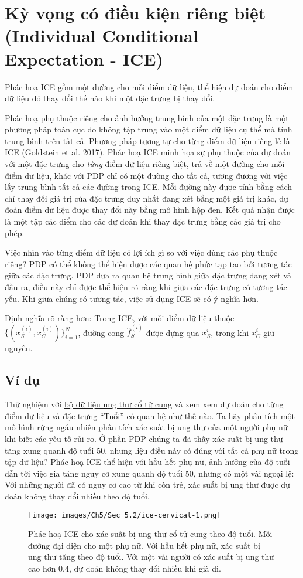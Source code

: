 \clearpage


\section{Kỳ vọng có điều kiện riêng biệt (Individual Conditional Expectation - ICE)}\label{Chap_5.2}
Phác hoạ ICE gồm một đường cho mỗi điểm dữ liệu, thể hiện dự đoán cho điểm dữ liệu đó thay đổi thế nào khi một đặc trưng bị thay đổi.

Phác hoạ phụ thuộc riêng cho ảnh hưởng trung bình của một đặc trưng là một phương pháp toàn cục do không tập trung vào một điểm dữ liệu cụ thể mà tính trung bình trên tất cả. Phương pháp tương tự cho từng điểm dữ liệu riêng lẻ là ICE (Goldstein et al. 2017). Phác hoạ ICE minh họa sự phụ thuộc của dự đoán với một đặc trưng cho \textit{từng} điểm dữ liệu riêng biệt, trả về một đường cho mỗi điểm dữ liệu, khác với PDP chỉ có một đường cho tất cả, tương đương với việc lấy trung bình tất cả các đường trong ICE. Mỗi đường này được tính bằng cách chỉ thay đổi giá trị của đặc trưng duy nhất đang xét bằng một giá trị khác, dự đoán điểm dữ liệu được thay đổi này bằng mô hình hộp đen. Kết quả nhận được là một tập các điểm cho các dự đoán khi thay đặc trưng bằng các giá trị cho phép.

Việc nhìn vào từng điểm dữ liệu có lợi ích gì so với việc dùng các phụ thuộc riêng? PDP có thể không thể hiện được các quan hệ phức tạp tạo bởi tương tác giữa các đặc trưng. PDP đưa ra quan hệ trung bình giữa đặc trưng đang xét và đầu ra, điều này chỉ được thể hiện rõ ràng khi giữa các đặc trưng có tương tác yếu. Khi giữa chúng có tương tác, việc sử dụng ICE sẽ có ý nghĩa hơn.

Định nghĩa rõ ràng hơn: Trong ICE, với mỗi điểm dữ liệu thuộc $\{(x_{S}^{(i)},x_{C}^{(i)})\}_{i=1}^N$, đường cong $\hat{f}_S^{(i)}$ được dựng qua $x_{S}^{i}$, trong khi $x_{C}^{i}$ giữ nguyên.
\subsection{Ví dụ}
Thử nghiệm với \href{chap_3.3}{bộ dữ liệu ung thư cổ tử cung} và xem xem dự đoán cho từng điểm dữ liệu và đặc trưng ``Tuổi'' có quan hệ như thế nào. Ta hãy phân tích một mô hình rừng ngẫu nhiên phân tích xác suất bị ung thư của một người phụ nữ khi biết các yếu tố rủi ro. Ở phần \href{Chap_5.1}{PDP} chúng ta đã thấy xác suất bị ung thư tăng xung quanh độ tuổi 50, nhưng liệu điều này có đúng với tất cả phụ nữ trong tập dữ liệu? Phác hoạ ICE thể hiện với hầu hết phụ nữ, ảnh hưởng của độ tuổi dẫn tới việc gia tăng nguy cơ xung quanh độ tuổi 50, nhưng có một vài ngoại lệ: Với những người đã có nguy cơ cao từ khi còn trẻ, xác suất bị ung thư được dự đoán không thay đổi nhiều theo độ tuổi.
\begin{figure*}[h!]
	\centering
	\texttt{[image: images/Ch5/Sec\_5.2/ice-cervical-1.png]}
	\label{fig:5_6}
	\caption{Phác hoạ ICE cho xác suất bị ung thư cổ tử cung theo độ tuổi. Mỗi đường đại diện cho một phụ nữ. Với hầu hết phụ nữ, xác suất bị ung thư tăng theo độ tuổi. Với một vài người có xác suất bị ung thư cao hơn $0.4$, dự đoán không thay đổi nhiều khi già đi.}
\end{figure*}

